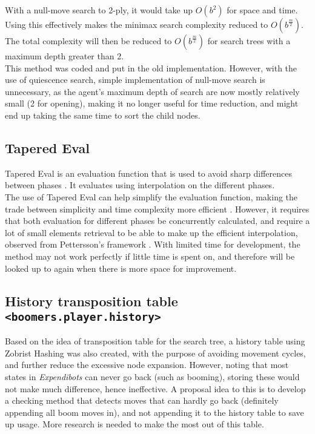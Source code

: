 \documentclass[]{article}
\newcommand{\gameName}{Expendibots}
\begin{document}
With a null-move search to 2-ply, it would take up $O(b^2)$ for space and time. Using this effectively makes the minimax search complexity reduced to $O(b^\frac{m}{2})$. The total complexity will then be reduced to $O(b^\frac{m}{2})$ for search trees with a maximum depth greater than 2.\\

This method was coded and put in the old implementation. However, with the use of quiescence search, simple implementation of null-move search is unnecessary, as the agent's maximum depth of search are now mostly relatively small (2 for opening), making it no longer useful for time reduction, and might end up taking the same time to sort the child nodes.

\subsection{Tapered Eval}

Tapered Eval is an evaluation function that is used to avoid sharp differences between phases \cite{tapered}. It evaluates using interpolation on the different phases.\\

The use of Tapered Eval can help simplify the evaluation function, making the trade between simplicity and time complexity more efficient \cite{eval}. However, it requires that both evaluation for different phases be concurrently calculated, and require a lot of small elements retrieval to be able to make up the efficient interpolation, observed from Pettersson's framework \cite{tapered}. With limited time for development, the method may not work perfectly if little time is spent on, and therefore will be looked up to again when there is more space for improvement.

\subsection{History transposition table \texttt{<boomers.player.history>}}

Based on the idea of transposition table for the search tree, a history table using Zobrist Hashing was also created, with the purpose of avoiding movement cycles, and further reduce the excessive node expansion. However, noting that most states in \emph{\gameName} can never go back (such as booming), storing these would not make much difference, hence ineffective. A proposal idea to this is to develop a checking method that detects moves that can hardly go back (definitely appending all boom moves in), and not appending it to the history table to save up usage. More research is needed to make the most out of this table.
\end{document}
